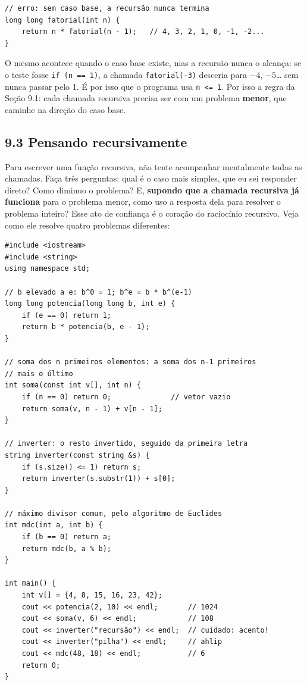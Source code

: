 \begin{codigo}
\begin{Verbatim}[breaklines=true, breaksymbolleft={}, fontsize=\footnotesize]
// erro: sem caso base, a recursão nunca termina
long long fatorial(int n) {
    return n * fatorial(n - 1);   // 4, 3, 2, 1, 0, -1, -2...
}
\end{Verbatim}
\end{codigo}

O mesmo acontece quando o caso base existe, mas a recursão nunca o alcança: se o teste fosse \texttt{if (n == 1)}, a chamada \texttt{fatorial(-3)} desceria para $-4$, $-5$\ldots{} sem nunca passar pelo 1. É por isso que o programa usa \texttt{n <= 1}. Por isso a regra da Seção 9.1: cada chamada recursiva precisa ser com um problema \textbf{menor}, que caminhe na direção do caso base.

\subsection{9.3 Pensando recursivamente}

Para escrever uma função recursiva, não tente acompanhar mentalmente todas as chamadas. Faça três perguntas: qual é o caso mais simples, que eu sei responder direto? Como diminuo o problema? E, \textbf{supondo que a chamada recursiva já funciona} para o problema menor, como uso a resposta dela para resolver o problema inteiro? Esse ato de confiança é o coração do raciocínio recursivo. Veja como ele resolve quatro problemas diferentes:

\begin{codigo}
\begin{Verbatim}[breaklines=true, breaksymbolleft={}, fontsize=\footnotesize]
#include <iostream>
#include <string>
using namespace std;

// b elevado a e: b^0 = 1; b^e = b * b^(e-1)
long long potencia(long long b, int e) {
    if (e == 0) return 1;
    return b * potencia(b, e - 1);
}

// soma dos n primeiros elementos: a soma dos n-1 primeiros
// mais o último
int soma(const int v[], int n) {
    if (n == 0) return 0;              // vetor vazio
    return soma(v, n - 1) + v[n - 1];
}

// inverter: o resto invertido, seguido da primeira letra
string inverter(const string &s) {
    if (s.size() <= 1) return s;
    return inverter(s.substr(1)) + s[0];
}

// máximo divisor comum, pelo algoritmo de Euclides
int mdc(int a, int b) {
    if (b == 0) return a;
    return mdc(b, a % b);
}

int main() {
    int v[] = {4, 8, 15, 16, 23, 42};
    cout << potencia(2, 10) << endl;       // 1024
    cout << soma(v, 6) << endl;            // 108
    cout << inverter("recursão") << endl;  // cuidado: acento!
    cout << inverter("pilha") << endl;     // ahlip
    cout << mdc(48, 18) << endl;           // 6
    return 0;
}
\end{Verbatim}
\end{codigo}

